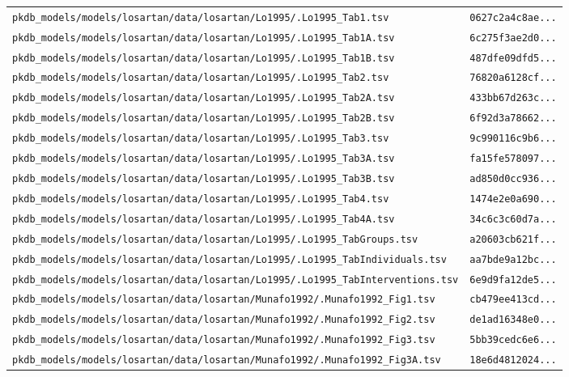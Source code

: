 \documentclass{article}
\begin{document}
\begin{longtable}{ll}
\texttt{pkdb\_models/models/losartan/data/losartan/Lo1995/.Lo1995\_Tab1.tsv} & \texttt{0627c2a4c8ae...} \\
\texttt{pkdb\_models/models/losartan/data/losartan/Lo1995/.Lo1995\_Tab1A.tsv} & \texttt{6c275f3ae2d0...} \\
\texttt{pkdb\_models/models/losartan/data/losartan/Lo1995/.Lo1995\_Tab1B.tsv} & \texttt{487dfe09dfd5...} \\
\texttt{pkdb\_models/models/losartan/data/losartan/Lo1995/.Lo1995\_Tab2.tsv} & \texttt{76820a6128cf...} \\
\texttt{pkdb\_models/models/losartan/data/losartan/Lo1995/.Lo1995\_Tab2A.tsv} & \texttt{433bb67d263c...} \\
\texttt{pkdb\_models/models/losartan/data/losartan/Lo1995/.Lo1995\_Tab2B.tsv} & \texttt{6f92d3a78662...} \\
\texttt{pkdb\_models/models/losartan/data/losartan/Lo1995/.Lo1995\_Tab3.tsv} & \texttt{9c990116c9b6...} \\
\texttt{pkdb\_models/models/losartan/data/losartan/Lo1995/.Lo1995\_Tab3A.tsv} & \texttt{fa15fe578097...} \\
\texttt{pkdb\_models/models/losartan/data/losartan/Lo1995/.Lo1995\_Tab3B.tsv} & \texttt{ad850d0cc936...} \\
\texttt{pkdb\_models/models/losartan/data/losartan/Lo1995/.Lo1995\_Tab4.tsv} & \texttt{1474e2e0a690...} \\
\texttt{pkdb\_models/models/losartan/data/losartan/Lo1995/.Lo1995\_Tab4A.tsv} & \texttt{34c6c3c60d7a...} \\
\texttt{pkdb\_models/models/losartan/data/losartan/Lo1995/.Lo1995\_TabGroups.tsv} & \texttt{a20603cb621f...} \\
\texttt{pkdb\_models/models/losartan/data/losartan/Lo1995/.Lo1995\_TabIndividuals.tsv} & \texttt{aa7bde9a12bc...} \\
\texttt{pkdb\_models/models/losartan/data/losartan/Lo1995/.Lo1995\_TabInterventions.tsv} & \texttt{6e9d9fa12de5...} \\
\texttt{pkdb\_models/models/losartan/data/losartan/Munafo1992/.Munafo1992\_Fig1.tsv} & \texttt{cb479ee413cd...} \\
\texttt{pkdb\_models/models/losartan/data/losartan/Munafo1992/.Munafo1992\_Fig2.tsv} & \texttt{de1ad16348e0...} \\
\texttt{pkdb\_models/models/losartan/data/losartan/Munafo1992/.Munafo1992\_Fig3.tsv} & \texttt{5bb39cedc6e6...} \\
\texttt{pkdb\_models/models/losartan/data/losartan/Munafo1992/.Munafo1992\_Fig3A.tsv} & \texttt{18e6d4812024...} \\

\end{longtable}
\end{document}
